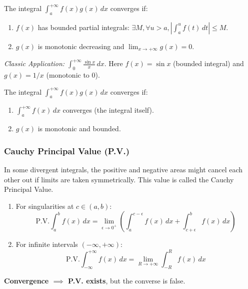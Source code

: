 \documentclass[oneside]{book}
\begin{document}
\begin{theorem}
The integral $\int_a^{+\infty} f(x)g(x) \, dx$ converges if:
\begin{enumerate}
    \item $f(x)$ has bounded partial integrals: $\exists M, \forall u > a, |\int_a^u f(t) \, dt| \le M$.
    \item $g(x)$ is monotonic decreasing and $\lim_{x \to +\infty} g(x) = 0$.
\end{enumerate}
\end{theorem}
\textit{Classic Application:} $\int_0^{+\infty} \frac{\sin x}{x} \, dx$. Here $f(x)=\sin x$ (bounded integral) and $g(x)=1/x$ (monotonic to 0).

\begin{theorem}
The integral $\int_a^{+\infty} f(x)g(x) \, dx$ converges if:
\begin{enumerate}
    \item $\int_a^{+\infty} f(x) \, dx$ converges (the integral itself).
    \item $g(x)$ is monotonic and bounded.
\end{enumerate}
\end{theorem}

\subsubsection{Cauchy Principal Value (P.V.)}

In some divergent integrals, the positive and negative areas might cancel each other out if limits are taken symmetrically. This value is called the Cauchy Principal Value.

\begin{definition}
\begin{enumerate}
    \item For singularities at $c \in (a, b)$:
    \[
    \text{P.V.} \int_a^b f(x) \, dx = \lim_{\epsilon \to 0^+} \left( \int_a^{c-\epsilon} f(x) \, dx + \int_{c+\epsilon}^b f(x) \, dx \right)
    \]
    \item For infinite intervals $(-\infty, +\infty)$:
    \[
    \text{P.V.} \int_{-\infty}^{+\infty} f(x) \, dx = \lim_{R \to +\infty} \int_{-R}^R f(x) \, dx
    \]
\end{enumerate}
\end{definition}

\begin{remark}
\textbf{Convergence $\implies$ P.V. exists}, but the converse is false.
\end{remark}
\end{document}
